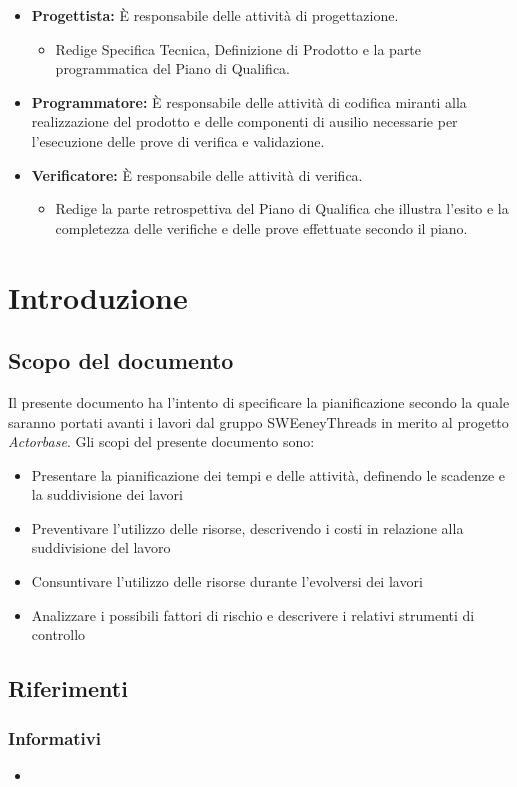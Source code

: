 \documentclass[a4paper]{report}
\newcommand{\mychapter}[2]{
	\setcounter{chapter}{#1}
	\setcounter{section}{0}
	\setcounter{subsection}{1}
	\chapter*{#2}
	\addcontentsline{toc}{chapter}{#2}
}
\begin{document}
\begin{appendices}
\begin{itemize}
				\item \textbf{Progettista:} È responsabile delle attività di progettazione. 
				\begin{itemize}
					\item Redige Specifica Tecnica, Definizione di Prodotto e la parte programmatica del Piano di Qualifica.
				\end{itemize}
				\item \textbf{Programmatore:} È responsabile delle attività di codifica miranti alla realizzazione del 
				prodotto e delle componenti di ausilio necessarie per l'esecuzione delle prove di verifica e validazione.
				\item \textbf{Verificatore:} È responsabile delle attività di verifica.
				\begin{itemize}
					\item Redige la parte retrospettiva del Piano di Qualifica che illustra l'esito e la completezza delle 
					verifiche e delle prove effettuate secondo il piano.
				\end{itemize}
			\end{itemize}
	\end{appendices}
	
	\mychapter{1}{Introduzione}
		\section{Scopo del documento}
			Il presente documento ha l'intento di specificare la pianificazione secondo la quale saranno portati avanti i 
			lavori dal gruppo SWEeneyThreads in merito al progetto \emph{Actorbase}.
			Gli scopi del presente documento sono:
			\begin{itemize}
				\item Presentare la pianificazione dei tempi e delle attività, definendo le scadenze e la suddivisione dei lavori
				\item Preventivare l’utilizzo delle risorse, descrivendo i costi in relazione alla suddivisione del lavoro
				\item Consuntivare l’utilizzo delle risorse durante l’evolversi dei lavori
				\item Analizzare i possibili fattori di rischio e descrivere i relativi strumenti di controllo
			\end{itemize}
		\section{Riferimenti}
			\subsection{Informativi}
				\begin{itemize}
					\item 
				\end{itemize}
\end{document}
